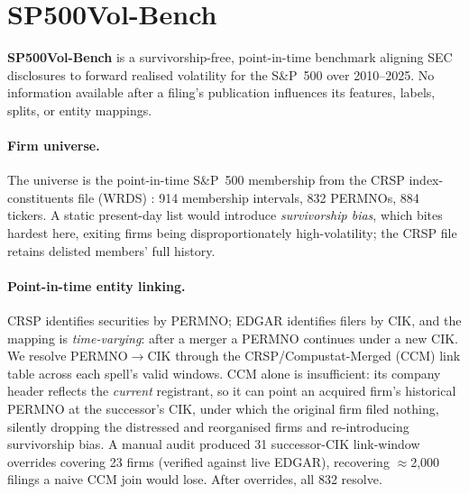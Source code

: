 \section{SP500Vol-Bench}
\label{sec:dataset}

\textbf{SP500Vol-Bench} is a survivorship-free, point-in-time benchmark aligning SEC disclosures to forward realised volatility for the S\&P~500 over 2010--2025. No information available after a filing's publication influences its features, labels, splits, or entity mappings.

\paragraph{Firm universe.}
The universe is the point-in-time S\&P~500 membership from the CRSP index-constituents file (WRDS) \citep{crsp2026data}: 914 membership intervals, 832 PERMNOs, 884 tickers. A static present-day list would introduce \emph{survivorship bias}, which bites hardest here, exiting firms being disproportionately high-volatility; the CRSP file retains delisted members' full history.

\paragraph{Point-in-time entity linking.}
CRSP identifies securities by PERMNO; EDGAR identifies filers by CIK, and the mapping is \emph{time-varying}: after a merger a PERMNO continues under a new CIK. We resolve PERMNO$\to$CIK through the CRSP/Compustat-Merged (CCM) link table across each spell's valid windows. CCM alone is insufficient: its company header reflects the \emph{current} registrant, so it can point an acquired firm's historical PERMNO at the successor's CIK, under which the original firm filed nothing, silently dropping the distressed and reorganised firms and re-introducing survivorship bias. A manual audit produced 31 successor-CIK link-window overrides covering 23 firms (verified against live EDGAR), recovering $\approx$2{,}000 filings a naive CCM join would lose. After overrides, all 832 resolve.

